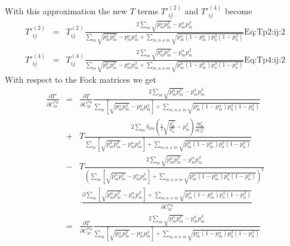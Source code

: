 \documentclass[pra,nofootinbib]{revtex4-1}
\newcommand{\dlabel}[1]{\text{#1}\label{#1}}
\begin{document}
With this approximation the new $T$ terms $T'^{(2)}_{ij}$ and $T'^{(4)}_{ij}$
become
\begin{eqnarray}
   T'^{(2)}_{ij} &=& 
   T^{(2)}_{ij}
   \frac{2\sum_{m}\sqrt{p^\alpha_m p^\beta_m}-p^\alpha_m p^\beta_m}
        { \sum_{m}\sqrt{p^\alpha_m p^\beta_m}-p^\alpha_m p^\beta_m
         +\sum_{m,n\ne m}\sqrt{p^\alpha_m(1-p^\alpha_m)p^\beta_n(1-p^\beta_n)}}
   \dlabel{Eq:Tp2:ij:2} \\
   T'^{(4)}_{ij} &=& 
   T^{(4)}_{ij}
   \frac{2\sum_{m}\sqrt{p^\alpha_m p^\beta_m}-p^\alpha_m p^\beta_m}
        { \sum_{m}\sqrt{p^\alpha_m p^\beta_m}-p^\alpha_m p^\beta_m
         +\sum_{m,n\ne m}\sqrt{p^\alpha_m(1-p^\alpha_m)p^\beta_n(1-p^\beta_n)}}
   \dlabel{Eq:Tp4:ij:2}
\end{eqnarray}
With respect to the Fock matrices we get
\begin{eqnarray}
   \frac{\partial T'}{\partial C^{*\alpha}_{kr}}
   &=& \frac{\partial T}{\partial C^{*\alpha}_{kr}}
       \frac{2\sum_{m}\sqrt{p^\alpha_m p^\beta_m}-p^\alpha_m p^\beta_m}
            { \sum_{m}\left[\sqrt{p^\alpha_m p^\beta_m}-p^\alpha_m p^\beta_m\right]
             +\sum_{m,n\ne m}\sqrt{p^\alpha_m(1-p^\alpha_m)p^\beta_n(1-p^\beta_n)}}
       \nonumber \\
   &+& T
       \frac{2\sum_{m}\delta_{km}\left(\frac{1}{2}
             \sqrt{\frac{p^\beta_m}{p^\alpha_m}}-p^\beta_m\right)
             \frac{\partial p^\alpha_m}{\partial C^{*\alpha}_{kr}}}
            { \sum_{m}\left[\sqrt{p^\alpha_m p^\beta_m}-p^\alpha_m p^\beta_m\right]
             +\sum_{m,n\ne m}\sqrt{p^\alpha_m(1-p^\alpha_m)p^\beta_n(1-p^\beta_n)}}
       \nonumber \\
   &-& T
       \frac{2\sum_{m}\sqrt{p^\alpha_m p^\beta_m}-p^\alpha_m p^\beta_m}
            {\left(
                 \sum_{m}\left[\sqrt{p^\alpha_m p^\beta_m}-p^\alpha_m p^\beta_m\right]
                +\sum_{m,n\ne m}\sqrt{p^\alpha_m(1-p^\alpha_m)p^\beta_n(1-p^\beta_n)}
             \right)^2} \nonumber \\
   &&  \cdot\frac{\partial\sum_{m}
            \left[\sqrt{p^\alpha_m p^\beta_m}-p^\alpha_m p^\beta_m\right]
             +\sum_{m,n\ne m}\sqrt{p^\alpha_m(1-p^\alpha_m)p^\beta_n(1-p^\beta_n)}}
            {\partial C^{*\alpha}_{kr}}
       \\
   &=& \frac{\partial T}{\partial C^{*\alpha}_{kr}}
       \frac{2\sum_{m}\sqrt{p^\alpha_m p^\beta_m}-p^\alpha_m p^\beta_m}
            { \sum_{m}\left[\sqrt{p^\alpha_m p^\beta_m}-p^\alpha_m p^\beta_m\right]
             +\sum_{m,n\ne m}\sqrt{p^\alpha_m(1-p^\alpha_m)p^\beta_n(1-p^\beta_n)}}

\end{eqnarray}
\end{document}
